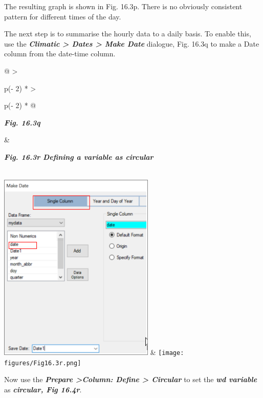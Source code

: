 \documentclass[
  letterpaper,
  DIV=11,
  numbers=noendperiod]{scrreprt}
\begin{document}
The resulting graph is shown in Fig. 16.3p. There is no obviously
consistent pattern for different times of the day.

The next step is to summarise the hourly data to a daily basis. To
enable this, use the \textbf{\emph{Climatic \textgreater{} Dates
\textgreater{} Make Date}} dialogue, Fig. 16.3q to make a Date column
from the date-time column.

\begin{longtable}[]{@{}
  >{\raggedright\arraybackslash}p{(\columnwidth - 2\tabcolsep) * }
  >{\raggedright\arraybackslash}p{(\columnwidth - 2\tabcolsep) * }@{}}
\toprule\noalign{}
\begin{minipage}[b]{\linewidth}\raggedright
\textbf{\emph{Fig. 16.3q}}
\end{minipage} & \begin{minipage}[b]{\linewidth}\raggedright
\textbf{\emph{Fig. 16.3r Defining a variable as circular}}
\end{minipage} \\
\midrule\noalign{}
\endhead
\bottomrule\noalign{}
\endlastfoot
\includegraphics[width=2.92682in,height=3.57307in]{figures/Fig16.3q.png}
&
\texttt{[image: figures/Fig16.3r.png]} \\
\end{longtable}

Now use the \textbf{\emph{Prepare \textgreater Column: Define
\textgreater{} Circular}} to set the \textbf{\emph{wd variable}} as
\textbf{\emph{circular, Fig 16.4r}}.
\end{document}
